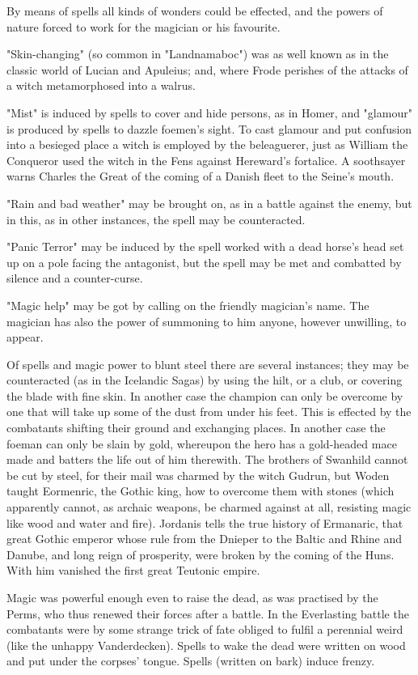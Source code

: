 \documentclass[10pt,a4paper]{report}
\begin{document}
By means of spells all kinds of wonders could be effected, and the powers of nature forced to work for the magician or his favourite.

"Skin-changing" (so common in "Landnamaboc") was as well known as in the classic world of Lucian and Apuleius; and, where Frode perishes of the attacks of a witch metamorphosed into a walrus.

"Mist" is induced by spells to cover and hide persons, as in Homer, and "glamour" is produced by spells to dazzle foemen's sight. To cast glamour and put confusion into a besieged place a witch is employed by the beleaguerer, just as William the Conqueror used the witch in the Fens against Hereward's fortalice. A soothsayer warns Charles the Great of the coming of a Danish fleet to the Seine's mouth.

"Rain and bad weather" may be brought on, as in a battle against the enemy, but in this, as in other instances, the spell may be counteracted.

"Panic Terror" may be induced by the spell worked with a dead horse's head set up on a pole facing the antagonist, but the spell may be met and combatted by silence and a counter-curse.

"Magic help" may be got by calling on the friendly magician's name. The magician has also the power of summoning to him anyone, however unwilling, to appear.

Of spells and magic power to blunt steel there are several instances; they may be counteracted (as in the Icelandic Sagas) by using the hilt, or a club, or covering the blade with fine skin. In another case the champion can only be overcome by one that will take up some of the dust from under his feet. This is effected by the combatants shifting their ground and exchanging places. In another case the foeman can only be slain by gold, whereupon the hero has a gold-headed mace made and batters the life out of him therewith. The brothers of Swanhild cannot be cut by steel, for their mail was charmed by the witch Gudrun, but Woden taught Eormenric, the Gothic king, how to overcome them with stones (which apparently cannot, as archaic weapons, be charmed against at all, resisting magic like wood and water and fire). Jordanis tells the true history of Ermanaric, that great Gothic emperor whose rule from the Dnieper to the Baltic and Rhine and Danube, and long reign of prosperity, were broken by the coming of the Huns. With him vanished the first great Teutonic empire.

Magic was powerful enough even to raise the dead, as was practised by the Perms, who thus renewed their forces after a battle. In the Everlasting battle the combatants were by some strange trick of fate obliged to fulfil a perennial weird (like the unhappy Vanderdecken). Spells to wake the dead were written on wood and put under the corpses' tongue. Spells (written on bark) induce frenzy.
\end{document}
